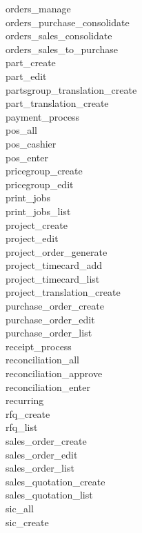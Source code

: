 \begin{description}
\item [orders\_manage]
\item [orders\_purchase\_consolidate]
\item [orders\_sales\_consolidate]
\item [orders\_sales\_to\_purchase]
\item [part\_create]
\item [part\_edit]
\item [partsgroup\_translation\_create]
\item [part\_translation\_create]
\item [payment\_process]
\item [pos\_all]
\item [pos\_cashier]
\item [pos\_enter]
\item [pricegroup\_create]
\item [pricegroup\_edit]
\item [print\_jobs]
\item [print\_jobs\_list]
\item [project\_create]
\item [project\_edit]
\item [project\_order\_generate]
\item [project\_timecard\_add]
\item [project\_timecard\_list]
\item [project\_translation\_create]
\item [purchase\_order\_create]
\item [purchase\_order\_edit]
\item [purchase\_order\_list]
\item [receipt\_process]
\item [reconciliation\_all]
\item [reconciliation\_approve]
\item [reconciliation\_enter]
\item [recurring]
\item [rfq\_create]
\item [rfq\_list]
\item [sales\_order\_create]
\item [sales\_order\_edit]
\item [sales\_order\_list]
\item [sales\_quotation\_create]
\item [sales\_quotation\_list]
\item [sic\_all]
\item [sic\_create]

\end{description}
